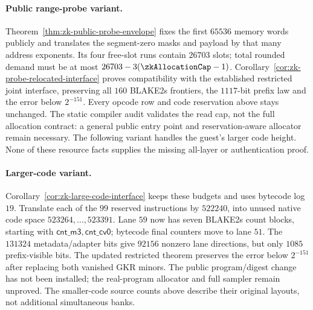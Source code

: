 \paragraph{Public range-probe variant.} Theorem~\ref{thm:zk-public-probe-envelope} fixes the first $65536$ memory words publicly and translates the segment-zero masks and payload by that many address exponents. Its four free-slot runs contain $26703$ slots; total rounded demand must be at most $26703-3(\zkAllocationCap-1)$. Corollary~\ref{cor:zk-probe-relocated-interface} proves compatibility with the established restricted joint interface, preserving all $160$ BLAKE2s frontiers, the $1117$-bit prefix law and the error below $2^{-151}$. Every opcode row and code reservation above stays unchanged. The static compiler audit validates the read cap, not the full allocation contract: a general public entry point and reservation-aware allocator remain necessary. The following variant handles the guest's larger code height. None of these resource facts supplies the missing all-layer or authentication proof.

\paragraph{Larger-code variant.} Corollary~\ref{cor:zk-large-code-interface} keeps these budgets and uses bytecode log $19$. Translate each of the $99$ reserved instructions by $522240$, into unused native code space $523264,\ldots,523391$. Lane $59$ now has seven BLAKE2s count blocks, starting with $\mathsf{cnt\_m3},\mathsf{cnt\_cv0}$; bytecode final counters move to lane $51$. The $131324$ metadata/adapter bits give $92156$ nonzero lane directions, but only $1085$ prefix-visible bits. The updated restricted theorem preserves the error below $2^{-151}$ after replacing both vanished GKR minors. The public program/digest change has not been installed; the real-program allocator and full sampler remain unproved. The smaller-code source counts above describe their original layouts, not additional simultaneous banks.

